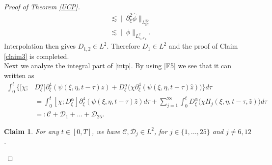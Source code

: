 \documentclass[reqno]{amsart}
\newcommand{\La}{\|\phi\|_{L^2_{r_1,r_2}}}
\newcommand{\p}{\partial}
\numberwithin{equation}{section}
\newtheorem{claim}[theorem]{Claim}
\begin{document}
\begin{proof}[Proof of Theorem \ref{UCP}]
\begin{equation}
\begin{split}
                            &\lesssim  \|\partial_\xi^2 \hat{\phi}\|_{L^{\infty}_{\xi\eta}}\\
                            &\lesssim \La.
\end{split}
\end{equation}
Interpolation then gives $D_{1,2}\in L^2$. Therefore $D_1 \in L^2$ and the proof of Claim \ref{claim3} is completed.\\






Next we analyze the integral  part of \eqref{intp}. By using \eqref{F5} we see that it can written as  
\begin{equation}
\begin{split}\label{D4} 
\int_{0}^{t}\Big\{[\chi;&D_{\xi}^{\alpha}]\p_\xi^4(\psi(\xi,\eta,t-\tau)\hat{z})+D_{\xi}^{\alpha}\big(\chi \p_\xi^4(\psi(\xi,\eta,t-\tau)\hat{z})\big)\Big\}d\tau\\
&=\int_0^t[\chi;D_{\xi}^{\alpha}]\p_\xi^4(\psi(\xi,\eta,t-\tau)\hat{z})d\tau+\sum_{j=1}^{28}\int_0^t D_{\xi}^{\alpha}\big(\chi H_j(\xi,\eta,t-\tau,\hat{z})\big)d\tau\\
&=: \mathcal C+\mathcal D_1+\dots+\mathcal D_{25}.
\end{split}
\end{equation}

\begin{claim}\label{claim4}
For any $t\in [0,T]$, we have $\mathcal{C}, \mathcal{D}_j \in L^2$, for $j\in \{1,...,25\}$ and $j \neq 6,12$.
\end{claim}


\end{proof}
\end{document}
